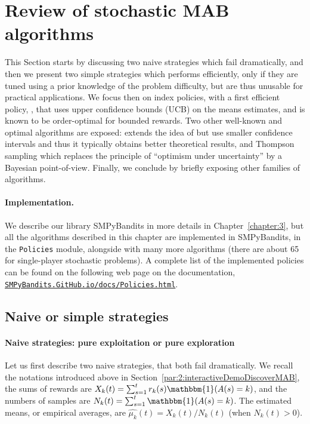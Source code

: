 \section{Review of stochastic MAB algorithms}
\label{sec:2:famousMABalgorithms}

This Section starts by discussing two naive strategies which fail dramatically,
%
and then we present two simple strategies which performs efficiently, only if they are tuned using a prior knowledge of the problem difficulty, but are thus unusable for practical applications.
%
We focus then on index policies, with a first efficient policy, \UCB, that uses upper confidence bounds (UCB) on the means estimates, and is known to be order-optimal for bounded rewards.
Two other well-known and optimal algorithms are exposed: \klUCB{} extends the idea of \UCB{} but use smaller confidence intervals and thus it typically obtains better theoretical results, and Thompson sampling which replaces the principle of ``optimism under uncertainty'' by a Bayesian point-of-view.
%
Finally, we conclude by briefly exposing other families of algorithms.


\paragraph{Implementation.}
%
We describe our library SMPyBandits in more details in Chapter~\ref{chapter:3}, but all the algorithms described in this chapter are implemented in SMPyBandits, in the \texttt{Policies} module, alongside with many more algorithms (there are about 65 for single-player stochastic problems).
A complete list of the implemented policies can be found on the following web page on the documentation,
\href{https://smpybandits.github.io/docs/Policies.html}{\texttt{SMPyBandits.GitHub.io/docs/Policies.html}}.


\subsection{Naive or simple strategies}
\label{sub:2:naiveSimpleStrategies}


\paragraph{Naive strategies: pure exploitation or pure exploration}

Let us first describe two naive strategies, that both fail dramatically.
We recall the notations introduced above in Section~\ref{par:2:interactiveDemoDiscoverMAB}, the sums of rewards are $X_k(t) = \sum_{s=1}^t r_k(s) \mathbbm{1}(A(s) = k)$, and the numbers of samples are $N_k(t) = \sum_{s=1}^t \mathbbm{1}(A(s) = k)$.
%
The estimated means, or empirical averages, are $\widehat{\mu_k}(t) = X_k(t) / N_k(t)$ (when $N_k(t)>0$).

